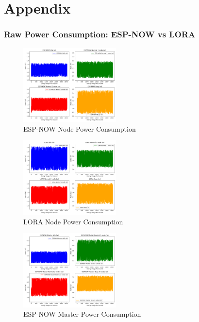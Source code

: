 \section{Appendix}\label{sec:appendix}

\subsubsection{Raw Power Consumption: ESP-NOW vs LORA}\label{sec:raw_power_consumption}
\begin{figure}[H]
  \begin{center}
    \includegraphics[width=0.45\textwidth]{./Figures/Power_Consumption/ESP-NOW.png}
  \end{center}
  \caption{ESP-NOW Node Power Consumption}\label{fig:espnow_node_power_consumption}
\end{figure}

\begin{figure}[H]
  \begin{center}
    \includegraphics[width=0.45\textwidth]{./Figures/Power_Consumption/LORA.png}
  \end{center}
  \caption{LORA Node Power Consumption}\label{fig:lora_node_power_consumption}
\end{figure}

\begin{figure}[H]
  \begin{center}
    \includegraphics[width=0.45\textwidth]{./Figures/Power_Consumption/ESP-NOW_MASTER.png}
  \end{center}
  \caption{ESP-NOW Master Power Consumption}\label{fig:espnowmaster_power_consumption}
\end{figure}

